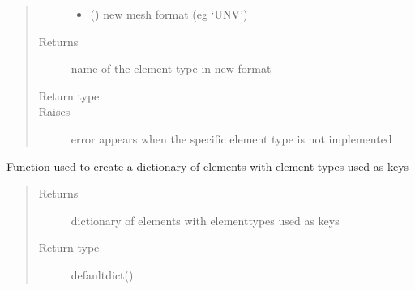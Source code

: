 \documentclass[letterpaper,10pt,english]{sphinxmanual}
\begin{document}
\begin{fulllineitems}
\begin{fulllineitems}
\begin{quote}
\begin{description}
\begin{itemize}
\item {} 
 () \textendash{} new mesh format (eg ‘UNV’)

\end{itemize}

\item[{Returns}] \leavevmode
name of the element type in new format

\item[{Return type}] \leavevmode
{}

\item[{Raises}] \leavevmode
{} \textendash{} error appears when the specific element type
    is not implemented

\end{description}\end{quote}

\end{fulllineitems}


\begin{fulllineitems}
\label{\detokenize{pyCofea/api:cofea.PartMesh.getElementsByType}}
Function used to create a dictionary of elements with
element types used as keys
\begin{quote}\begin{description}
\item[{Returns}] \leavevmode
dictionary of elements with elementtypes used as keys

\item[{Return type}] \leavevmode
defaultdict()

\end{description}\end{quote}

\end{fulllineitems}



\end{fulllineitems}
\end{document}
